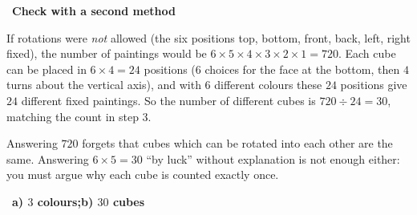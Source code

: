 \documentclass[11pt]{article}
\providecommand{\AnsWord}{Đáp số}
\newcommand{\ans}[1]{\par\smallskip{\bfseries\color{tmGreen!88!black}\AnsWord:}\ {\bfseries\color{AnsRed}#1}\par}
\newcommand{\step}[2]{\par\smallskip\noindent{\bfseries\color{tmBlue!85!black}\StepWord~#1.}\ {\bfseries #2}\par\nopagebreak}
\def\AnsWord{Answer}
\def\StepWord{Step}
\begin{document}
{\step{4}{Check with a second method}
If rotations were \emph{not} allowed (the six positions top, bottom, front, back, left, right fixed), the number of paintings would be
$6\times5\times4\times3\times2\times1=720$. Each cube can be placed in $6\times4=24$ positions ($6$ choices for the face at the bottom, then
$4$ turns about the vertical axis), and with $6$ different colours these $24$ positions give $24$ different fixed paintings.
So the number of different cubes is $720\div24=30$, matching the count in step 3.
\begin{warnbox}Answering $720$ forgets that cubes which can be rotated into each other are the same. Answering $6\times5=30$ ``by luck''
without explanation is not enough either: you must argue why each cube is counted exactly once.\end{warnbox}
\ans{a) $3$ colours;\quad b) $30$ cubes}
}
\end{document}

